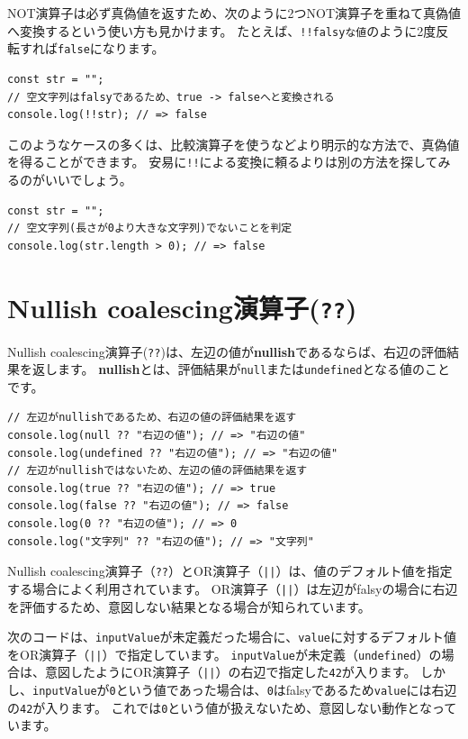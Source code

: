 NOT演算子は必ず真偽値を返すため、次のように2つNOT演算子を重ねて真偽値へ変換するという使い方も見かけます。
たとえば、\texttt{!!falsyな値}のように2度反転すれば\texttt{false}になります。

\begin{lstlisting}
const str = "";
// 空文字列はfalsyであるため、true -> falseへと変換される
console.log(!!str); // => false
\end{lstlisting}

このようなケースの多くは、比較演算子を使うなどより明示的な方法で、真偽値を得ることができます。
安易に\texttt{!!}による変換に頼るよりは別の方法を探してみるのがいいでしょう。

\begin{lstlisting}
const str = "";
// 空文字列(長さが0より大きな文字列)でないことを判定
console.log(str.length > 0); // => false
\end{lstlisting}

\hypertarget{nullish-coalescing-operator}{%
\section{Nullish coalescing演算子(\texttt{??})\,\protect{}}\label{nullish-coalescing-operator}}

Nullish coalescing演算子(\texttt{??})は、左辺の値が\textbf{nullish}であるならば、右辺の評価結果を返します。
\textbf{nullish}とは、評価結果が\texttt{null}または\texttt{undefined}となる値のことです。

\begin{lstlisting}
// 左辺がnullishであるため、右辺の値の評価結果を返す
console.log(null ?? "右辺の値"); // => "右辺の値"
console.log(undefined ?? "右辺の値"); // => "右辺の値"
// 左辺がnullishではないため、左辺の値の評価結果を返す
console.log(true ?? "右辺の値"); // => true
console.log(false ?? "右辺の値"); // => false
console.log(0 ?? "右辺の値"); // => 0
console.log("文字列" ?? "右辺の値"); // => "文字列"
\end{lstlisting}

Nullish coalescing演算子（\texttt{??}）とOR演算子（\texttt{||}）は、値のデフォルト値を指定する場合によく利用されています。
OR演算子（\texttt{||}）は左辺がfalsyの場合に右辺を評価するため、意図しない結果となる場合が知られています。

次のコードは、\texttt{inputValue}が未定義だった場合に、\texttt{value}に対するデフォルト値をOR演算子（\texttt{||}）で指定しています。
\texttt{inputValue}が未定義（\texttt{undefined}）の場合は、意図したようにOR演算子（\texttt{||}）の右辺で指定した\texttt{42}が入ります。
しかし、\texttt{inputValue}が\texttt{0}という値であった場合は、\texttt{0}はfalsyであるため\texttt{value}には右辺の\texttt{42}が入ります。
これでは\texttt{0}という値が扱えないため、意図しない動作となっています。

